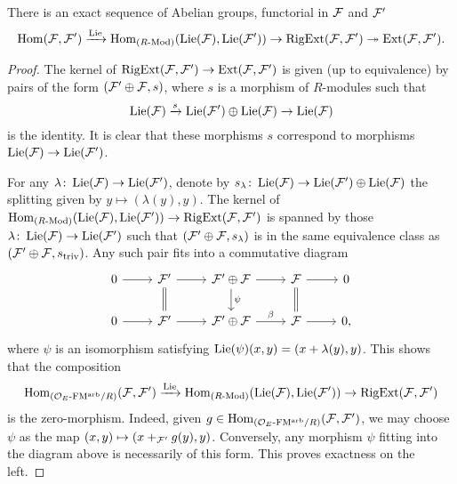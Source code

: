 \documentclass[../main.tex]{subfiles}
\begin{document}
\begin{prop}\label{prop:InterestingES}
  There is an exact sequence of Abelian groups, functorial in
  $\mathcal{F}$ and $\mathcal{F}'$
  \begin{equation*}
    \operatorname{Hom}(\mathcal{F}, \mathcal{F}') \xrightarrow{\operatorname{Lie}} \operatorname{Hom}_{{({R}\textnormal-\allowbreak\mathrm{Mod})}}(\operatorname{Lie}(\mathcal{F}), \operatorname{Lie}(\mathcal{F}')) \to \operatorname {RigExt}(\mathcal{F}, \mathcal{F}') \twoheadrightarrow
    \operatorname{Ext}(\mathcal{F}, \mathcal{F}'). 
  \end{equation*}
\begin{proof}
  The kernel of $\operatorname {RigExt}(\mathcal{F},\mathcal{F}') \to \operatorname{Ext}(\mathcal{F},\mathcal{F}')$ is given (up to
  equivalence) by 
  pairs of the form $(\mathcal{F}' \oplus \mathcal{F}, s)$, where $s$ is a morphism
  of $R$-modules such that 
  $$ \operatorname{Lie}(\mathcal{F}) \xrightarrow{s} \operatorname{Lie}(\mathcal{F}') \oplus \operatorname{Lie}(\mathcal{F}) \to  \operatorname{Lie}(\mathcal{F})$$
  is the identity. It is clear that these morphisms $s$ correspond to morphisms 
  $\operatorname{Lie}(\mathcal{F}) \to \operatorname{Lie}(\mathcal{F}')$. 

  For any $\lambda\colon \operatorname{Lie}(\mathcal{F}) \to \operatorname{Lie}(\mathcal{F}')$, denote by $s_\lambda \colon 
  \operatorname{Lie}(\mathcal{F}) \to \operatorname{Lie}(\mathcal{F}') \oplus \operatorname{Lie}(\mathcal{F})$ the splitting given by 
  $y \mapsto (\lambda(y) , y)$.
  The kernel of $\operatorname{Hom}_{{({R}\textnormal-\allowbreak\mathrm{Mod})}}(\operatorname{Lie}(\mathcal{F}), \operatorname{Lie}(\mathcal{F}')) \to \operatorname {RigExt}(\mathcal{F},
  \mathcal{F}')$ is spanned by those $\lambda\colon \operatorname{Lie}(\mathcal{F}) \to \operatorname{Lie}(\mathcal{F}')$ such that 
  $(\mathcal{F}' \oplus \mathcal{F}, s_\lambda)$ is in the same equivalence
  class as $(\mathcal{F}' \oplus \mathcal{F}, s_{\mathrm{triv}})$. Any such pair fits into
  a commutative diagram 
  \begin{equation*}
    \begin{tikzcd}[ampersand replacement=\&]
    	0 \& {\cF'} \& {\cF' \oplus \cF} \& \cF \& 0 \\
    	0 \& {\cF'} \& {\cF' \oplus \cF} \& \cF \& 0,
    	\arrow[from=1-1, to=1-2]
    	\arrow[from=1-2, to=1-3]
    	\arrow[Rightarrow, no head, from=1-2, to=2-2]
    	\arrow[from=1-3, to=1-4]
    	\arrow["\psi", from=1-3, to=2-3]
    	\arrow[from=1-4, to=1-5]
    	\arrow[Rightarrow, no head, from=1-4, to=2-4]
    	\arrow[from=2-1, to=2-2]
    	\arrow[ from=2-2, to=2-3]
    	\arrow["\beta", from=2-3, to=2-4]
    	\arrow[from=2-4, to=2-5]
    \end{tikzcd}
  \end{equation*}
  where $\psi$ is an isomorphism satisfying $\operatorname{Lie}(\psi)(x,y) = (x + \lambda(y), y)$.
  This shows that the composition 
  \begin{equation*}
    \operatorname{Hom}_{{({\mathcal{O}_E}\textnormal-\allowbreak\mathrm{FM^{arb}}/{R})}}(\mathcal{F}, \mathcal{F}') \xrightarrow{\operatorname{Lie}} \operatorname{Hom}_{{({R}\textnormal-\allowbreak\mathrm{Mod})}}(\operatorname{Lie}(\mathcal{F}),
    \operatorname{Lie}(\mathcal{F}')) \to \operatorname {RigExt}(\mathcal{F}, \mathcal{F}')
  \end{equation*}
  is the zero-morphism. Indeed, given $g \in  \operatorname{Hom}_{{({\mathcal{O}_E}\textnormal-\allowbreak\mathrm{FM^{arb}}/{R})}}(\mathcal{F},
  \mathcal{F}')$, we may choose $\psi$ as the map $(x, y) \mapsto (x +_{\mathcal{F}'} g(y),
  y)$. Conversely, any morphism $\psi$ fitting into the diagram above is
  necessarily of this form. This proves exactness on the left.
\end{proof}
\end{prop}
\end{document}
